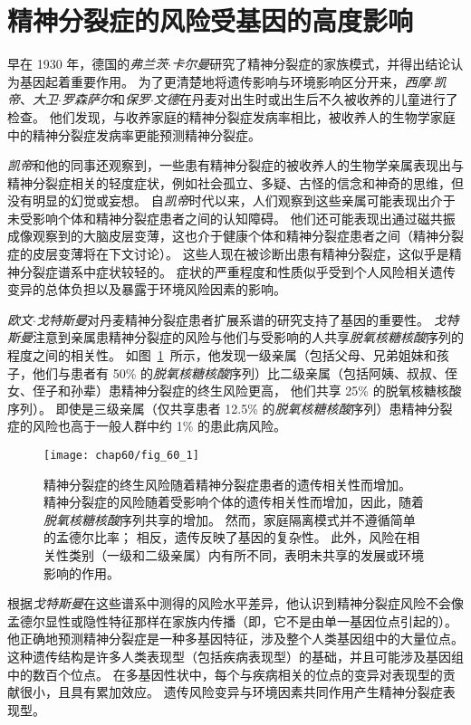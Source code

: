 \section{精神分裂症的风险受基因的高度影响}

早在 1930 年，德国的\textit{弗兰茨$\cdot$卡尔曼}研究了精神分裂症的家族模式，并得出结论认为基因起着重要作用。
为了更清楚地将遗传影响与环境影响区分开来，\textit{西摩$\cdot$凯帝}、\textit{大卫$\cdot$罗森萨尔}和\textit{保罗$\cdot$文德}在丹麦对出生时或出生后不久被收养的儿童进行了检查。
他们发现，与收养家庭的精神分裂症发病率相比，被收养人的生物学家庭中的精神分裂症发病率更能预测精神分裂症。


\textit{凯帝}和他的同事还观察到，一些患有精神分裂症的被收养人的生物学亲属表现出与精神分裂症相关的轻度症状，例如社会孤立、多疑、古怪的信念和神奇的思维，但没有明显的幻觉或妄想。
自\textit{凯帝}时代以来，人们观察到这些亲属可能表现出介于未受影响个体和精神分裂症患者之间的认知障碍。
他们还可能表现出通过磁共振成像观察到的大脑皮层变薄，这也介于健康个体和精神分裂症患者之间（精神分裂症的皮层变薄将在下文讨论）。
这些人现在被诊断出患有精神分裂症，这似乎是精神分裂症谱系中症状较轻的。
症状的严重程度和性质似乎受到个人风险相关遗传变异的总体负担以及暴露于环境风险因素的影响。


\textit{欧文$\cdot$戈特斯曼}对丹麦精神分裂症患者扩展系谱的研究支持了基因的重要性。
\textit{戈特斯曼}注意到亲属患精神分裂症的风险与他们与受影响的人共享\textit{脱氧核糖核酸}序列的程度之间的相关性。
如图~\ref{fig:60_1}~所示，他发现一级亲属（包括父母、兄弟姐妹和孩子，他们与患者有 50\% 的\textit{脱氧核糖核酸}序列）比二级亲属（包括阿姨、叔叔、侄女、侄子和孙辈）患精神分裂症的终生风险更高， 他们共享 25\% 的脱氧核糖核酸序列）。
即使是三级亲属（仅共享患者 12.5\% 的\textit{脱氧核糖核酸}序列）患精神分裂症的风险也高于一般人群中约 1\% 的患此病风险。


\begin{figure}[htbp]
	\centering
	\texttt{[image: chap60/fig\_60\_1]}
	\caption{精神分裂症的终生风险随着精神分裂症患者的遗传相关性而增加。
		精神分裂症的风险随着受影响个体的遗传相关性而增加，因此，随着\textit{脱氧核糖核酸}序列共享的增加。
		然而，家庭隔离模式并不遵循简单的孟德尔比率；
		相反，遗传反映了基因的复杂性。
		此外，风险在相关性类别（一级和二级亲属）内有所不同，表明未共享的发展或环境影响的作用\cite{gottesman1991schizophrenia}。}
	\label{fig:60_1}
\end{figure}


根据\textit{戈特斯曼}在这些谱系中测得的风险水平差异，他认识到精神分裂症风险不会像孟德尔显性或隐性特征那样在家族内传播（即，它不是由单一基因位点引起的）。
他正确地预测精神分裂症是一种多基因特征，涉及整个人类基因组中的大量位点。
这种遗传结构是许多人类表现型（包括疾病表现型）的基础，并且可能涉及基因组中的数百个位点。
在多基因性状中，每个与疾病相关的位点的变异对表现型的贡献很小，且具有累加效应。
遗传风险变异与环境因素共同作用产生精神分裂症表现型。


